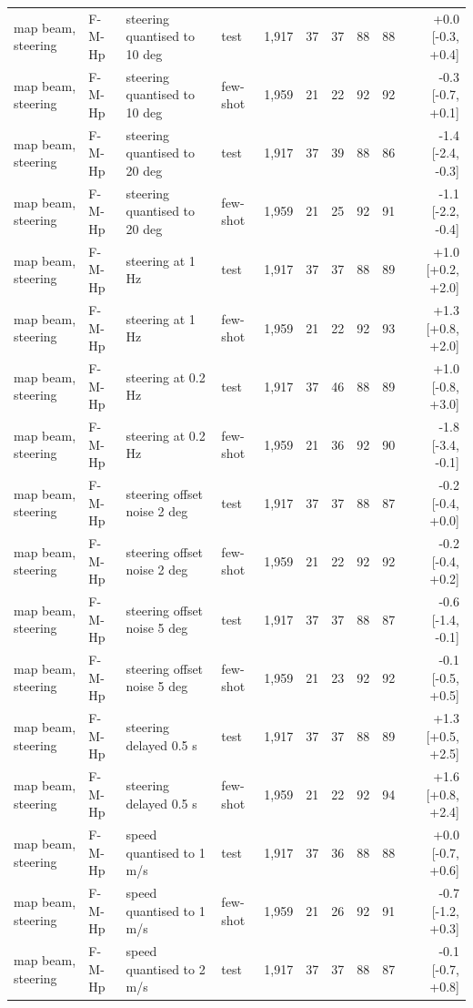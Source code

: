 \begin{table}[t]
\begin{tabular}{llllrrrrrr}
map beam, steering & F-M-Hp & steering quantised to 10 deg & test & 1{,}917 & 37 & 37 & 88 & 88 & +0.0 [-0.3, +0.4] \\
map beam, steering & F-M-Hp & steering quantised to 10 deg & few-shot & 1{,}959 & 21 & 22 & 92 & 92 & -0.3 [-0.7, +0.1] \\
map beam, steering & F-M-Hp & steering quantised to 20 deg & test & 1{,}917 & 37 & 39 & 88 & 86 & -1.4 [-2.4, -0.3] \\
map beam, steering & F-M-Hp & steering quantised to 20 deg & few-shot & 1{,}959 & 21 & 25 & 92 & 91 & -1.1 [-2.2, -0.4] \\
map beam, steering & F-M-Hp & steering at 1 Hz & test & 1{,}917 & 37 & 37 & 88 & 89 & +1.0 [+0.2, +2.0] \\
map beam, steering & F-M-Hp & steering at 1 Hz & few-shot & 1{,}959 & 21 & 22 & 92 & 93 & +1.3 [+0.8, +2.0] \\
map beam, steering & F-M-Hp & steering at 0.2 Hz & test & 1{,}917 & 37 & 46 & 88 & 89 & +1.0 [-0.8, +3.0] \\
map beam, steering & F-M-Hp & steering at 0.2 Hz & few-shot & 1{,}959 & 21 & 36 & 92 & 90 & -1.8 [-3.4, -0.1] \\
map beam, steering & F-M-Hp & steering offset noise 2 deg & test & 1{,}917 & 37 & 37 & 88 & 87 & -0.2 [-0.4, +0.0] \\
map beam, steering & F-M-Hp & steering offset noise 2 deg & few-shot & 1{,}959 & 21 & 22 & 92 & 92 & -0.2 [-0.4, +0.2] \\
map beam, steering & F-M-Hp & steering offset noise 5 deg & test & 1{,}917 & 37 & 37 & 88 & 87 & -0.6 [-1.4, -0.1] \\
map beam, steering & F-M-Hp & steering offset noise 5 deg & few-shot & 1{,}959 & 21 & 23 & 92 & 92 & -0.1 [-0.5, +0.5] \\
map beam, steering & F-M-Hp & steering delayed 0.5 s & test & 1{,}917 & 37 & 37 & 88 & 89 & +1.3 [+0.5, +2.5] \\
map beam, steering & F-M-Hp & steering delayed 0.5 s & few-shot & 1{,}959 & 21 & 22 & 92 & 94 & +1.6 [+0.8, +2.4] \\
map beam, steering & F-M-Hp & speed quantised to 1 m/s & test & 1{,}917 & 37 & 36 & 88 & 88 & +0.0 [-0.7, +0.6] \\
map beam, steering & F-M-Hp & speed quantised to 1 m/s & few-shot & 1{,}959 & 21 & 26 & 92 & 91 & -0.7 [-1.2, +0.3] \\
map beam, steering & F-M-Hp & speed quantised to 2 m/s & test & 1{,}917 & 37 & 37 & 88 & 87 & -0.1 [-0.7, +0.8] \\

\end{tabular}
\end{table}
